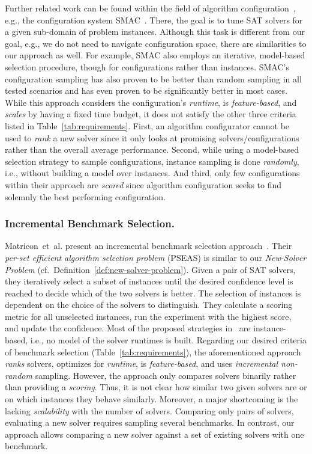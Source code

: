 \documentclass[runningheads]{llncs}
\begin{document}
Further related work can be found within the field of algorithm configuration~\cite{HoosHL21,Stutzle0P22}, e.g., the configuration system SMAC~\cite{HutterHL11}.
There, the goal is to tune SAT solvers for a given sub-domain of problem instances.
Although this task is different from our goal, e.g., we do not need to navigate configuration space, there are similarities to our approach as well.
For example, SMAC also employs an iterative, model-based selection procedure, though for configurations rather than instances.
SMAC's configuration sampling has also proven to be better than random sampling in all tested scenarios and has even proven to be significantly better in most cases.
While this approach considers the configuration's \emph{runtime}, is \emph{feature-based}, and \emph{scales} by having a fixed time budget, it does not satisfy the other three criteria listed in Table~\ref{tab:requirements}.
First, an algorithm configurator cannot be used to \emph{rank} a new solver since it only looks at promising solvers/configurations rather than the overall average performance.
Second, while using a model-based selection strategy to sample configurations, instance sampling is done \emph{randomly}, i.e., without building a model over instances.
And third, only few configurations within their approach are \emph{scored} since algorithm configuration seeks to find solemnly the best performing configuration.

\subsubsection{Incremental Benchmark Selection.}

Matricon~et~al. present an incremental benchmark selection approach~\cite{MatriconAFSH21}.
Their \emph{per-set efficient algorithm selection problem} (PSEAS) is similar to our \emph{New-Solver Problem} (cf.~Definition~\ref{def:new-solver-problem}).
Given a pair of SAT solvers, they iteratively select a subset of instances until the desired confidence level is reached to decide which of the two solvers is better.
The selection of instances is dependent on the choice of the solvers to distinguish.
They calculate a scoring metric for all unselected instances, run the experiment with the highest score, and update the confidence.
Most of the proposed strategies in~\cite{MatriconAFSH21} are instance-based, i.e., no model of the solver runtimes is built.
Regarding our desired criteria of benchmark selection (Table~\ref{tab:requirements}), the aforementioned approach \emph{ranks} solvers, optimizes for \emph{runtime}, is \emph{feature-based}, and uses \emph{incremental non-random} sampling.
However, the approach only compares solvers binarily rather than providing a \emph{scoring}.
Thus, it is not clear how similar two given solvers are or on which instances they behave similarly.
Moreover, a major shortcoming is the lacking \emph{scalability} with the number of solvers.
Comparing only pairs of solvers, evaluating a new solver requires sampling several benchmarks.
In contrast, our approach allows comparing a new solver against a set of existing solvers with one benchmark.
\end{document}

